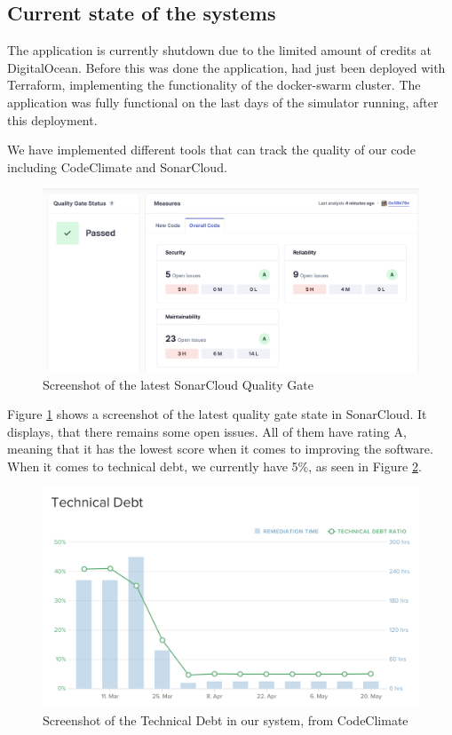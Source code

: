 \subsection{Current state of the systems}
The application is currently shutdown due to the limited amount of credits at DigitalOcean. 
Before this was done the application, had just been deployed with Terraform, implementing the functionality of the docker-swarm cluster. The application was fully functional on the last days of the simulator running, after this deployment.\newline

\noindent We have implemented different tools that can track the quality of our code including CodeClimate and SonarCloud.

\begin{figure}[H]
    \centering
    \includegraphics[width=\textwidth]{images/QualityGate.png}
    \caption{Screenshot of the latest SonarCloud Quality Gate}
    \label{img:qualitygate}
\end{figure}

\noindent Figure \ref{img:qualitygate} shows a screenshot of the latest quality gate state in SonarCloud. It displays, that there remains some open issues.  All of them have rating A, meaning that it has the lowest score when it comes to improving the software. \cite{codeclimate} When it comes to technical debt, we currently have 5\%, as seen in Figure \ref{img:technical dept}. 


\begin{figure}[H]
    \centering
    \includegraphics[width=\textwidth]{images/Technical Debt.png}
    \caption{Screenshot of the Technical Debt in our system, from CodeClimate}
    \label{img:technical dept}
\end{figure}

